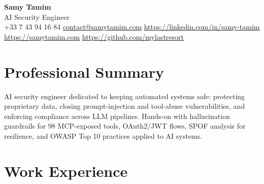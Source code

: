 \documentclass[10pt,a4paper]{article}
\begin{document}
\begin{center}
  {\LARGE\bfseries\color{accent} Samy Tamim}\\[1.5pt]
  {\small AI Security Engineer}\\[1.5pt]
  \footnotesize
  +33 7 43 94 16 84 \enspace\textbullet\enspace \href{mailto:contact@samytamim.com}{contact@samytamim.com} \enspace\textbullet\enspace \href{https://linkedin.com/in/samy-tamim}{https://linkedin.com/in/samy-tamim} \enspace\textbullet\enspace \href{https://samytamim.com}{https://samytamim.com} \enspace\textbullet\enspace \href{https://github.com/mylastresort}{https://github.com/mylastresort}
\end{center}

\section{Professional Summary}
AI security engineer dedicated to keeping automated systems safe: protecting proprietary data, closing prompt-injection and tool-abuse vulnerabilities, and enforcing compliance across LLM pipelines. Hands-on with hallucination guardrails for 98 MCP-exposed tools, OAuth2/JWT flows, SPOF analysis for resilience, and OWASP Top 10 practices applied to AI systems.

\section{Work Experience}
\end{document}
